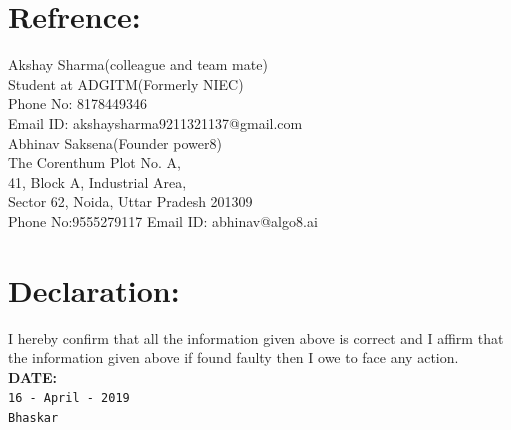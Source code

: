 \documentclass[10pt]{report}
\begin{document}
\section*{Refrence:}%
Akshay Sharma(colleague and team mate)\\
Student at ADGITM(Formerly NIEC)\\
Phone No: 8178449346\\
Email ID: akshaysharma9211321137@gmail.com \\[2pt]
 
\noindent Abhinav Saksena(Founder power8)\\
The Corenthum Plot No. A,\\
41, Block A, Industrial Area,\\
Sector 62, Noida, Uttar Pradesh 201309\\
Phone No:9555279117
Email ID: abhinav@algo8.ai

\section*{Declaration:}%
\large I hereby confirm that all the information given above is correct and I affirm that the information given above if found faulty then I owe to face any action.\\[20pt]

\noindent\textbf{\large DATE:}\\[8pt]  
\verb"16 - April - 2019"\\[50pt] %

\hfill\LARGE\verb|Bhaskar|
\end{document}
